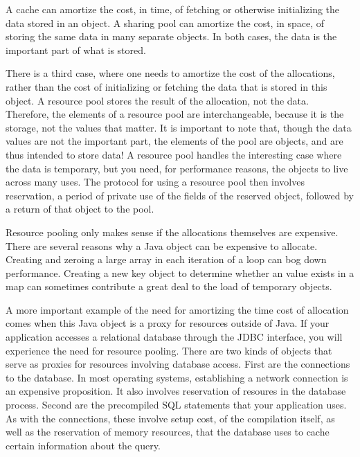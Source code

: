 A cache can amortize the cost, in time, of fetching or otherwise initializing the
data stored in an object. A sharing pool can amortize the cost, in space, of
storing the same data in many separate objects. In both cases, the data is the
important part of what is stored.

 There is a third case,
where one needs to amortize the cost of the allocations, rather than the cost of
initializing or fetching the data that is stored in this object. A resource pool
stores the result of the allocation, not the data. Therefore, the elements of a
resource pool are interchangeable, because it is the storage, not the values that
matter. It is important to note that, though the data values are not the
important part, the elements of the pool are objects, and are thus intended to
store data! A resource pool handles the interesting case where the data is
temporary, but you need, for performance reasons, the objects to live across many
uses. The protocol for using a resource pool then involves reservation, a period
of private use of the fields of the reserved object, followed by a return of that
object to the pool.

Resource pooling only makes sense if the allocations themselves are expensive.
There are several reasons why a Java object can be expensive to allocate.
Creating and zeroing a large array in each iteration of a
loop can bog down performance. Creating a new key object to determine whether an
value exists in a map can sometimes contribute a great deal to the load of
temporary objects.

A more important example of the need for amortizing the time cost of allocation
comes when this Java object is a proxy for resources outside of Java. If your
application accesses a relational database through the JDBC
interface, you will experience the need for resource pooling. There are two kinds
of objects that serve as proxies for resources involving database access. First
are the connections to the database. In most operating systems, establishing a
network connection is an expensive proposition. It also involves reservation of
resoures in the database process. Second are the precompiled SQL statements that
your application uses. As with the connections, these involve setup cost, of the
compilation itself, as well as the reservation of memory resources, that the
database uses to cache certain information about the query.

